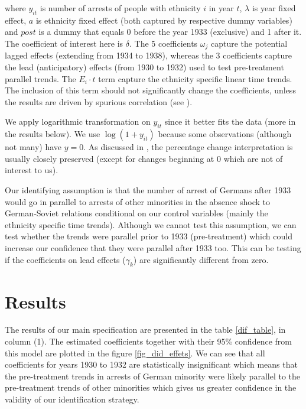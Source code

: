 \documentclass[11pt]{article}
\begin{document}
where $y_{it}$ is number of arrests of people with ethnicity $i$ in year $t$, $\lambda$ is year fixed effect, $a$ is ethnicity fixed effect (both captured by respective dummy variables) and $post$ is a dummy that equals 0 before the year 1933 (exclusive) and 1 after it. The coefficient of interest here is $\delta$. The 5 coefficients $\omega_j$ capture the potential lagged effects (extending from 1934 to 1938), whereas the 3 coefficients capture the lead (anticipatory) effects (from 1930 to 1932) used to test pre-treatment parallel trends.  The $ E_i \cdot t$ term capture the ethnicity specific linear time trends. The inclusion of this term should not significantly  change the coefficients, unless the results are driven by spurious correlation (see \citealt{angrist_mostly_2009}). 

 We apply logarithmic transformation on $y_{it}$ since it better fits the data (more in the results below).  We use $\log\left(1 + y_{it}\right)$ because some observations (although not many) have $y = 0$. As discussed in \citet[p. 193]{wooldridge_introductory_2015},  the percentage change interpretation is usually  closely preserved (except for changes beginning at 0 which are not of interest to us).   

Our identifying assumption is that the number of arrest of Germans after 1933 would go in parallel to arrests of other minorities in the absence shock to German-Soviet relations conditional on our control variables (mainly the ethnicity specific time trends). Although we cannot test this assumption, we can test whether the trends were parallel prior to 1933 (pre-treatment) which could increase our confidence that they were parallel after 1933 too. This can be testing if the coefficients on lead effects ($\gamma_k$) are significantly different from zero.  
\section{Results}
The results of our main specification are presented in the table \ref{dif_table}, in column (1). The estimated coefficients together with their 95\% confidence  from this model are plotted in the figure \ref{fig_did_effets}. We can see that all coefficients for years 1930 to 1932 are statistically insignificant which means that the pre-treatment trends in arrests of German minority were likely parallel to the pre-treatment trends of other minorities which gives us greater  confidence in the validity of our identification strategy. 
\end{document}
